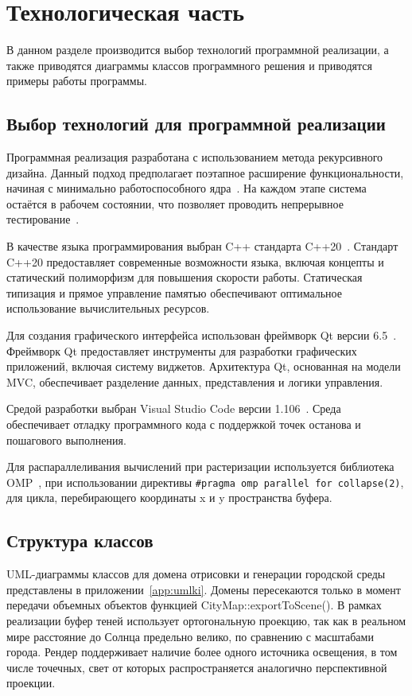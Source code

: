 \chapter{Технологическая часть}
В данном разделе производится выбор технологий программной реализации, а также приводятся диаграммы классов программного решения и приводятся примеры работы программы.
\section{Выбор технологий для программной реализации}

Программная реализация разработана с использованием метода рекурсивного дизайна. Данный подход предполагает поэтапное расширение функциональности, начиная с минимально работоспособного ядра~\cite{fowler_refactoring}. На каждом этапе система остаётся в рабочем состоянии, что позволяет проводить непрерывное тестирование~\cite{booch_uml}.

В качестве языка программирования выбран C++ стандарта C++20~\cite{cpp20_features}. Стандарт C++20 предоставляет современные возможности языка, включая концепты и статический полиморфизм для повышения скорости работы. Статическая типизация и прямое управление памятью обеспечивают оптимальное использование вычислительных ресурсов.

Для создания графического интерфейса использован фреймворк Qt версии 6.5~\cite{qt_documentation}. Фреймворк Qt предоставляет инструменты для разработки графических приложений, включая систему виджетов. Архитектура Qt, основанная на модели MVC, обеспечивает разделение данных, представления и логики управления.

Средой разработки выбран Visual Studio Code версии 1.106~\cite{vscode_debug}. Среда обеспечивает отладку программного кода с поддержкой точек останова и пошагового выполнения.

Для распараллеливания вычислений при растеризации используется библиотека OMP~\cite{openmp60}, при использовании директивы \texttt{\#pragma omp parallel for collapse(2)}, для цикла, перебирающего координаты x и y пространства буфера.

\section{Структура классов}
UML-диаграммы классов для домена отрисовки и генерации городской среды представлены в приложении~\ref{app:umlki}.
Домены пересекаются только в момент передачи объемных объектов функцией CityMap::exportToScene().
В рамках реализации буфер теней использует ортогональную проекцию, так как в реальном мире расстояние до Солнца предельно велико, по сравнению с масштабами города. Рендер поддерживает наличие более одного источника освещения, в том числе точечных, свет от которых распространяется аналогично перспективной проекции.

